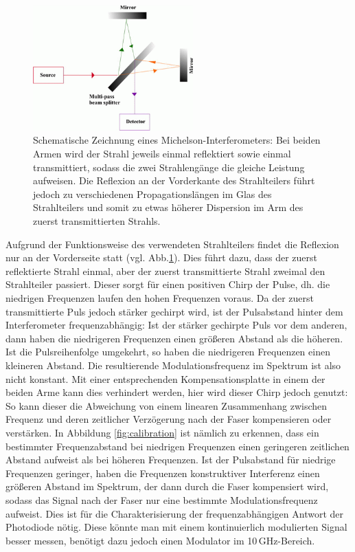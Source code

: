 \documentclass[bachelor,       %
               twoside,        %
               BCOR10mm,       %
               liststotoc,nomtotoc,bibtotoc, %
               english,ngerman, %
               final,          %
               ]{GAUBM}
\begin{document}
\begin{figure}[!htb]
	\centering
	\includegraphics[width=0.55\textwidth]{figures/multi_pass_beam_splitter.png}
	\caption{Schematische Zeichnung eines Michelson-Interferometers\protect\footnotemark:
	Bei beiden Armen wird der Strahl jeweils einmal reflektiert sowie einmal transmittiert, sodass die zwei Strahlengänge die gleiche Leistung aufweisen.
	Die Reflexion an der Vorderkante des Strahlteilers führt jedoch zu verschiedenen Propagationslängen im Glas des Strahlteilers und somit zu etwas höherer Dispersion im Arm des zuerst transmittierten Strahls.}
	\label{fig:Beamsplitter}
\end{figure}

Aufgrund der Funktionsweise des verwendeten Strahlteilers findet die Reflexion nur an der Vorderseite statt (vgl. Abb.\ref{fig:Beamsplitter}).
Dies führt dazu, dass der zuerst reflektierte Strahl einmal, aber der zuerst transmittierte Strahl zweimal den Strahlteiler passiert.
Dieser sorgt für einen positiven Chirp der Pulse, dh. die niedrigen Frequenzen laufen den hohen Frequenzen voraus.
Da der zuerst transmittierte Puls jedoch stärker gechirpt wird, ist der Pulsabstand   hinter dem Interferometer frequenzabhängig: Ist der stärker gechirpte Puls vor dem anderen, dann haben die niedrigeren Frequenzen einen größeren Abstand als die höheren. Ist die Pulsreihenfolge umgekehrt, so haben die niedrigeren Frequenzen einen kleineren Abstand.
Die resultierende Modulationsfrequenz im Spektrum ist also nicht konstant.
Mit einer entsprechenden Kompensationsplatte in einem der beiden Arme kann dies verhindert werden, hier wird dieser Chirp jedoch genutzt:
So kann dieser die Abweichung von einem linearen Zusammenhang zwischen Frequenz und deren zeitlicher Verzögerung nach der Faser kompensieren oder verstärken.
In Abbildung \ref{fig:calibration} ist nämlich zu erkennen, dass ein bestimmter Frequenzabstand bei niedrigen Frequenzen einen geringeren zeitlichen Abstand aufweist als bei höheren Frequenzen.
Ist der Pulsabstand für niedrige Frequenzen geringer, haben die Frequenzen konstruktiver Interferenz einen größeren Abstand im Spektrum, der dann durch die Faser kompensiert wird, sodass das Signal nach der Faser nur eine bestimmte Modulationsfrequenz aufweist.
Dies ist für die Charakterisierung der frequenzabhängigen Antwort der Photodiode nötig.
Diese könnte man mit einem kontinuierlich modulierten Signal besser messen, benötigt dazu jedoch einen Modulator im 10\,GHz-Bereich.
\end{document}
